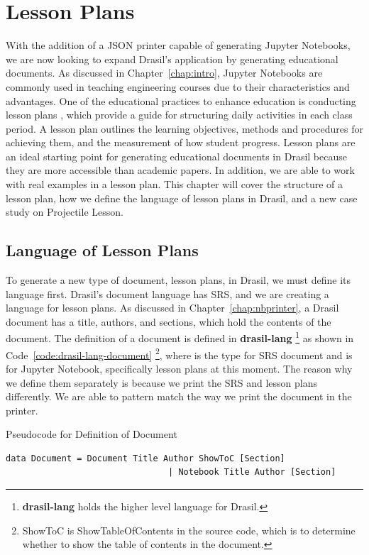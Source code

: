 \chapter{Lesson Plans} \label{chap:lessonplan}
With the addition of a JSON printer capable of generating Jupyter Notebooks, we 
are now looking to expand Drasil's application by generating educational 
documents. As discussed in Chapter~\ref{chap:intro}, Jupyter Notebooks are 
commonly used in teaching engineering courses due to their characteristics and 
advantages. One of the educational practices to enhance education is conducting 
lesson plans \cite{cicek2013effective, wong2018first}, which provide a 
guide for structuring daily activities in each class period. A lesson plan 
outlines the learning objectives, methods and procedures for achieving them, 
and the measurement of how student progress. Lesson plans are an ideal starting 
point for generating educational documents in Drasil because they are more 
accessible than academic papers. In addition, we are able to work with real 
examples in a lesson plan. This chapter will cover the structure of a lesson 
plan, how we define the language of lesson plans in Drasil, and a new case 
study on Projectile Lesson.

\section{Language of Lesson Plans} \label{chap:lessonLang}
To generate a new type of document, lesson plans, in Drasil, we must define its 
language first. Drasil's document language has SRS, and we are creating a 
language for lesson plans. As discussed in Chapter~\ref{chap:nbprinter}, a 
Drasil document has a title, authors, and sections, which hold the contents 
of the document. The definition of a document is defined in 
\textbf{drasil-lang} \footnote{\textbf{drasil-lang} holds the higher level 
language for Drasil.} as shown in Code~\ref{code:drasil-lang-document} 
\footnote{ShowToC is ShowTableOfContents in the source code, which is to 
determine whether to show the table of contents in the document.}, where 
 is the type for SRS document and  is for 
Jupyter Notebook, specifically lesson plans at this moment. The reason why we 
define them separately is because we print the SRS and lesson plans 
differently. We are able to pattern match the way we print the document in the 
printer.

\begin{listing}[h]
	\caption{Pseudocode for Definition of Document}
	\label{code:drasil-lang-document}
	\begin{lstlisting}[language=haskell1]
	data Document = Document Title Author ShowToC [Section]
								| Notebook Title Author [Section]
	\end{lstlisting}
\end{listing}

